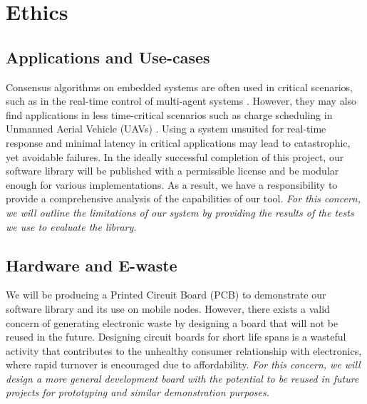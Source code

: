 \section{Ethics}

\subsection{Applications and Use-cases}
Consensus algorithms on embedded systems are often used in critical scenarios, such as in the real-time control of multi-agent systems \cite{ConsensusClassDiscretetime, Olfati_Saber_Fax_Murray_2007}. However, they may also find applications in less time-critical scenarios such as charge scheduling in Unmanned Aerial Vehicle (UAVs) \cite{hassijaSchedulingDroneCharging2020}. Using a system unsuited for real-time response and minimal latency in critical applications may lead to catastrophic, yet avoidable failures. In the ideally successful completion of this project, our software library will be published with a permissible license and be modular enough for various implementations. As a result, we have a responsibility to provide a comprehensive analysis of the capabilities of our tool. \textit{For this concern, we will outline the limitations of our system by providing the results of the tests we use to evaluate the library.}

\subsection{Hardware and E-waste}
We will be producing a Printed Circuit Board (PCB) to demonstrate our software library and its use on mobile nodes. However, there exists a valid concern of generating electronic waste by designing a board that will not be reused in the future. Designing circuit boards for short life spans is a wasteful activity that contributes to the unhealthy consumer relationship with electronics, where rapid turnover is encouraged due to affordability. \textit{For this concern, we will design a more general development board with the potential to be reused in future projects for prototyping and similar demonstration purposes.}